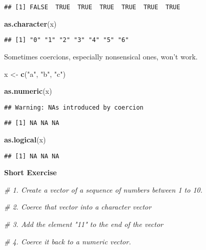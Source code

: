 \documentclass[
]{book}
\newenvironment{Shaded}{\begin{snugshade}}{\end{snugshade}}
\newcommand{\CommentTok}[1]{\textcolor[rgb]{0.56,0.35,0.01}{\textit{#1}}}
\newcommand{\KeywordTok}[1]{\textcolor[rgb]{0.13,0.29,0.53}{\textbf{#1}}}
\newcommand{\NormalTok}[1]{#1}
\newcommand{\StringTok}[1]{\textcolor[rgb]{0.31,0.60,0.02}{#1}}
\begin{document}
\begin{verbatim}
## [1] FALSE  TRUE  TRUE  TRUE  TRUE  TRUE  TRUE
\end{verbatim}

\begin{Shaded}
\begin{Highlighting}[]
\KeywordTok{as.character}\NormalTok{(x)}
\end{Highlighting}
\end{Shaded}

\begin{verbatim}
## [1] "0" "1" "2" "3" "4" "5" "6"
\end{verbatim}

Sometimes coercions, especially nonsensical ones, won't work.

\begin{Shaded}
\begin{Highlighting}[]
\NormalTok{x \textless{}{-}}\StringTok{ }\KeywordTok{c}\NormalTok{(}\StringTok{"a"}\NormalTok{, }\StringTok{"b"}\NormalTok{, }\StringTok{"c"}\NormalTok{)}

\KeywordTok{as.numeric}\NormalTok{(x)}
\end{Highlighting}
\end{Shaded}

\begin{verbatim}
## Warning: NAs introduced by coercion
\end{verbatim}

\begin{verbatim}
## [1] NA NA NA
\end{verbatim}

\begin{Shaded}
\begin{Highlighting}[]
\KeywordTok{as.logical}\NormalTok{(x)}
\end{Highlighting}
\end{Shaded}

\begin{verbatim}
## [1] NA NA NA
\end{verbatim}

\textbf{Short Exercise}

\begin{Shaded}
\begin{Highlighting}[]
\CommentTok{\# 1. Create a vector of a sequence of numbers between 1 to 10.}

\CommentTok{\# 2. Coerce that vector into a character vector}

\CommentTok{\# 3. Add the element "11" to the end of the vector}

\CommentTok{\# 4. Coerce it back to a numeric vector.}
\end{Highlighting}
\end{Shaded}
\end{document}
